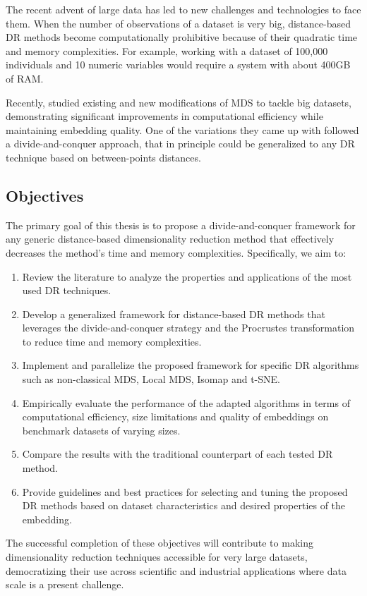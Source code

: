 The recent advent of large data has led to new challenges and technologies to face them. When the number of observations of a dataset is very big, distance-based DR methods become computationally prohibitive because of their quadratic time and memory complexities. For example, working with a dataset of 100,000 individuals and 10 numeric variables would require a system with about 400GB of RAM.

Recently, \cite{Delicado2024} studied existing and new modifications of MDS to tackle big datasets, demonstrating significant improvements in computational efficiency while maintaining embedding quality. One of the variations they came up with followed a divide-and-conquer approach, that in principle could be generalized to any DR technique based on between-points distances.

\subsection{Objectives}

The primary goal of this thesis is to propose a divide-and-conquer framework for any generic distance-based dimensionality reduction method that effectively decreases the method's time and memory complexities. Specifically, we aim to:

\begin{enumerate}
    \item Review the literature to analyze the properties and applications of the most used DR techniques.
    \item Develop a generalized framework for distance-based DR methods that leverages the divide-and-conquer strategy and the Procrustes transformation to reduce time and memory complexities.
    \item Implement and parallelize the proposed framework for specific DR algorithms such as non-classical MDS, Local MDS, Isomap and t-SNE.
    \item Empirically evaluate the performance of the adapted algorithms in terms of computational efficiency, size limitations and quality of embeddings on benchmark datasets of varying sizes.
    \item Compare the results with the traditional counterpart of each tested DR method.
    \item Provide guidelines and best practices for selecting and tuning the proposed DR methods based on dataset characteristics and desired properties of the embedding.
\end{enumerate}

The successful completion of these objectives will contribute to making  dimensionality reduction techniques accessible for very large datasets, democratizing their use across scientific and industrial applications where data scale is a present challenge.